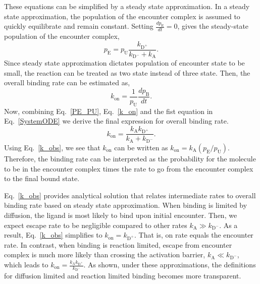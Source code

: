 \documentclass[../talant.diss.submit.tex]{subfiles}
\begin{document}
These equations can be simplified by a steady state approximation.
In a steady state approximation,
the population of the encounter complex is assumed to quickly equilibrate and remain constant.
Setting $\frac{dp_{\mathrm{E}}}{dt} = 0$, gives the steady-state
population of the encounter complex,
%
%
\begin{equation}
  \label{PE_PU}
  p_{\mathrm{E}} = p_{\mathrm{U}} \frac{k_{\mathrm{D}^{+}}}{k_{\mathrm{D}^{-}} + k_{\mathrm{A}}}.     
\end{equation}       
%
%
Since steady state approximation dictates population of encounter state to be small, the reaction
can be treated as two state instead of three state. Then, the overall binding rate can be estimated as,
%
%
\begin{equation}
  \label{k_on}
  k_{\mathrm{on}} = \frac{1}{p_{\mathrm{U}}} \frac{dp_{\mathrm{B}}}{dt}.   
\end{equation}       
%
%
Now, combining Eq.~\ref{PE_PU}, Eq.~\ref{k_on} and the fist equation in Eq.~\ref{SystemODE}
we derive the final expression for overall binding rate.
%
%
\begin{equation}
  \label{k_obs}
  k_{\mathrm{on}} = \frac{k_{\mathrm{A}} k_{\mathrm{D}^{+}}}{ k_{\mathrm{A}} + k_{\mathrm{D}^{-}}}.
\end{equation}       
%
%
Using Eq.~\ref{k_obs}, we see that $k_{\mathrm{on}}$ can be written as
$k_{\mathrm{on}} = k_{\mathrm{A}}(p_{\mathrm{E}}/p_{\mathrm{U}})$. Therefore, the binding rate
can be interpreted as the probability for the molecule to be in the encounter complex
times the rate to go from the encounter complex to the final bound state.

Eq.~\ref{k_obs} provides analytical solution that relates intermediate rates to
overall binding rate based on steady state approximation. When binding is
limited by diffusion, the ligand is most likely to bind upon initial
encounter. Then, we expect escape rate to be negligible compared to other rates
$k_{\mathrm{A}} \gg k_{\mathrm{D}^{-}}$. As a result, Eq.~\ref{k_obs} simplifies
to $k_{\mathrm{on}} = k_{\mathrm{D}^{+}}$. That is, on rate equals the encounter
rate. In contrast, when binding is reaction limited, escape from encounter
complex is much more likely than crossing the activation barrier,
$k_{\mathrm{A}} \ll k_{\mathrm{D}^{-}}$, which leads to
$k_{\mathrm{on}} = \frac{k_{\mathrm{A}}
  k_{\mathrm{D}^{+}}}{k_{\mathrm{D}^{-}}}$.
As shown, under these approximations, the definitions for diffusion
limited and reaction limited binding becomes more transparent.
\end{document}
